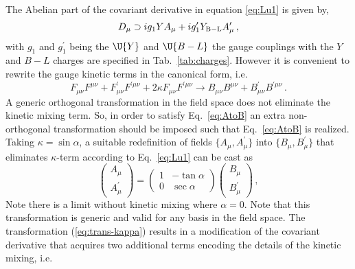 The Abelian part of the covariant derivative in equation \ref{eq:Lu1} is given by,
\begin{equation}
	D_\mu \supset i g_1 Y A_\mu + i g_1^\prime Y_{\rm B-L} A_\mu^\prime\,,
\end{equation} 
% 
with $g_1$ and $g_1^\prime$ being the $\U{Y}$ and $\U{B-L}$ the gauge couplings with the $Y$ and $B-L$ charges are specified in Tab.~\ref{tab:charges}. However it is convenient to rewrite the gauge kinetic terms in the canonical form, i.e.
%
\begin{equation}
	F_{\mu \nu} F^{\mu \nu} + F^\prime_{\mu \nu} F^{\prime \mu \nu} + 2 \kappa F_{\mu \nu} F^{\prime \mu \nu} \to B_{\mu \nu} B^{\mu \nu} + B^\prime_{\mu \nu} B^{\prime \mu \nu}\,.
	\label{eq:AtoB}
\end{equation}
%
A generic orthogonal transformation in the field space does not eliminate the kinetic mixing term. So, in order to satisfy Eq.~\eqref{eq:AtoB} an extra non-orthogonal transformation should be imposed such that Eq.~\eqref{eq:AtoB} is realized. Taking $\kappa = \sin \alpha$, a suitable redefinition of fields $\{A_\mu,A_\mu^\prime\}$ into $\{B_\mu, B_\mu^\prime\}$ that eliminates $\kappa$-term according to Eq.~\eqref{eq:Lu1} can be cast as
\begin{equation}
	\begin{pmatrix}
	A_\mu \\
	A^\prime_\mu 
	\end{pmatrix}
	=
	\begin{pmatrix}
	1 & -\tan \alpha \\
	0 & \sec \alpha 
	\end{pmatrix}
	\begin{pmatrix}
	B_\mu \\
	B^\prime_\mu 
	\end{pmatrix}\,,
	\label{eq:trans-kappa}
\end{equation}
Note there is a limit without kinetic mixing where $\alpha = 0$. Note that this transformation is generic and valid for any basis in the field space. The transformation (\ref{eq:trans-kappa}) results in a modification of the covariant derivative that acquires two additional terms encoding the details of the kinetic mixing, i.e.

